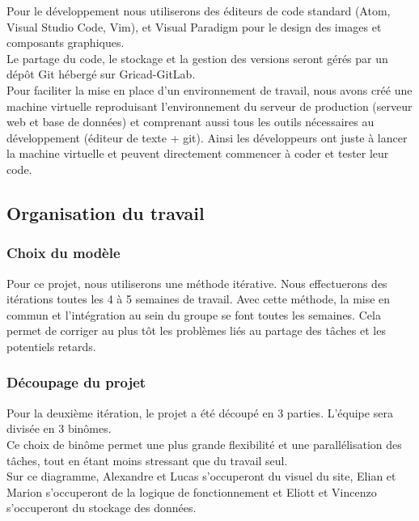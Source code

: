 \documentclass[a4paper,11pt]{article}
\begin{document}
Pour le développement nous utiliserons des éditeurs de code standard (Atom, Visual Studio Code, Vim), et Visual Paradigm
pour le design des images et composants graphiques.\\

Le partage du code, le stockage et la gestion des versions seront gérés par un dépôt Git hébergé sur
Gricad-GitLab.\\

Pour faciliter la mise en place d'un environnement de travail, nous avons créé une machine virtuelle
reproduisant l'environnement du serveur de production (serveur web et base de données) et comprenant
aussi tous les outils nécessaires au développement (éditeur de texte + git). Ainsi les développeurs
ont juste à lancer la machine virtuelle et peuvent directement commencer à coder et tester leur code.

\subsection{Organisation du travail}

\subsubsection{Choix du modèle}

Pour ce projet, nous utiliserons une méthode itérative. Nous effectuerons des itérations toutes les 4
à 5 semaines de travail. Avec cette méthode, la mise en commun et l'intégration au sein du groupe se font toutes les semaines.
Cela permet de corriger au plus tôt les problèmes liés au partage des tâches et les potentiels retards.\\

\subsubsection{Découpage du projet}

Pour la deuxième itération, le projet a été découpé en 3 parties. L’équipe sera divisée en 3 binômes.\\

Ce choix de binôme permet une plus grande flexibilité et une parallélisation des tâches, tout en étant
moins stressant que du travail seul.\\

Sur ce diagramme, Alexandre et Lucas s'occuperont du visuel du site,
Elian et Marion s'occuperont de la logique de fonctionnement et
Eliott et Vincenzo s'occuperont du stockage des données.\\
\end{document}
